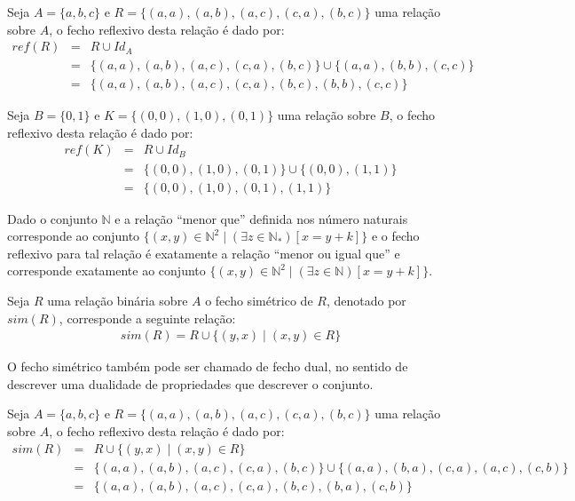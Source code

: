 \begin{example}
	Seja $A = \{a, b, c\}$ e $R = \{(a, a), (a, b), (a, c), (c, a), (b, c)\}$ uma relação sobre $A$,  o fecho reflexivo desta relação é dado por:
	\begin{eqnarray*}
		ref(R)  & = & R \cup Id_A\\
		& = & \{(a, a), (a, b), (a, c), (c, a), (b, c)\} \cup \{(a,a), (b, b), (c,c)\}\\
		& = & \{(a, a), (a, b), (a, c), (c, a), (b, c), (b, b), (c,c)\}
	\end{eqnarray*}
\end{example}

\begin{example}
	Seja $B = \{0, 1\}$ e $K= \{(0, 0), (1, 0), (0, 1)\}$ uma relação sobre $B$,  o fecho reflexivo desta relação é dado por:
	\begin{eqnarray*}
		ref(K)  & = & R \cup Id_B\\
		& = & \{(0, 0), (1, 0), (0, 1)\} \cup \{(0,0), (1, 1)\}\\
		& = & \{(0, 0), (1, 0), (0, 1), (1, 1)\} 
	\end{eqnarray*}
\end{example}

\begin{example}
	Dado o conjunto $\mathbb{N}$ e a relação ``menor que'' definida nos número naturais corresponde ao conjunto $\{(x, y) \in \mathbb{N}^2 \mid (\exists z \in \mathbb{N}_*)[x = y + k]\}$ e o fecho reflexivo para tal relação é exatamente a relação ``menor ou igual que'' e corresponde exatamente ao conjunto $\{(x, y) \in \mathbb{N}^2 \mid (\exists z \in \mathbb{N})[x = y + k]\}$.
\end{example}

\begin{definition}\label{def:FechoSimetrico}
	Seja $R$ uma relação binária sobre $A$ o fecho simétrico de $R$, denotado por $sim(R)$, corresponde a seguinte relação:
	\begin{eqnarray*}
		sim(R) = R \cup \{(y, x) \mid (x, y) \in R\}
	\end{eqnarray*}
\end{definition}

\begin{remark}
	O fecho simétrico também pode ser chamado de fecho dual, no sentido de descrever uma dualidade de propriedades que descrever o conjunto.
\end{remark}

\begin{example}
	Seja $A = \{a, b, c\}$ e $R = \{(a, a), (a, b), (a, c), (c, a), (b, c)\}$ uma relação sobre $A$,  o fecho reflexivo desta relação é dado por:
	\begin{eqnarray*}
		sim(R) & = &   R \cup \{(y, x) \mid (x, y) \in R\}\\
		& = &  \{(a, a), (a, b), (a, c), (c, a), (b, c)\} \cup \{(a, a), (b, a), (c, a), (a, c), (c, b)\}\\
		& = & \{(a, a), (a, b), (a, c), (c, a), (b, c), (b, a), (c, b)\}
	\end{eqnarray*}
\end{example}

